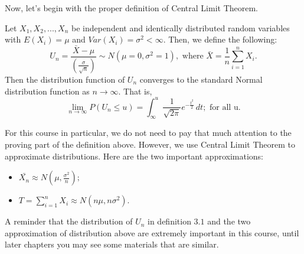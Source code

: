 \noindent
Now, let's begin with the proper definition of Central Limit Theorem.

\begin{definition}
Let $X_1, X_2, ..., X_n$ be independent and identically distributed random variables with $E(X_i) = \mu$ and $Var(X_i) = \sigma^2 < \infty$. Then, we define the following: \[ U_{n} = \frac{\bar{X} - \mu}{(\frac{\sigma}{\sqrt{n}})} \sim N(\mu = 0, \sigma^2 = 1), \text{ where $\bar{X} = \frac{1}{n} \sum_{i =1}^{n}X_i$.}\]
Then the distribution function of $U_{n}$ converges to the standard Normal distribution function as $n \longrightarrow \infty$. That is, \[ \lim_{n\to\infty}P(U_n \le u) = \int_{\infty}^{u} \frac{1}{\sqrt{2\pi}} e^{-\frac{t^2}{2}}\,dt; \text{ for all u.}\]
\end{definition}

\noindent
For this course in particular, we do not need to pay that much attention to the proving part of the definition above. However, we use Central Limit Theorem to approximate distributions. Here are the two important approximations:

\begin{itemize}
	\item $\bar{X_n} \approx N(\mu, \frac{\sigma^2}{n});$
	\item $T = \sum_{i = 1}^{n}X_i \approx N(n\mu, n\sigma^2).$
\end{itemize}

\noindent
A reminder that the distribution of $U_n$ in definition $3.1$ and the two approximation of distribution above are extremely important in this course, until later chapters you may see some materials that are similar.